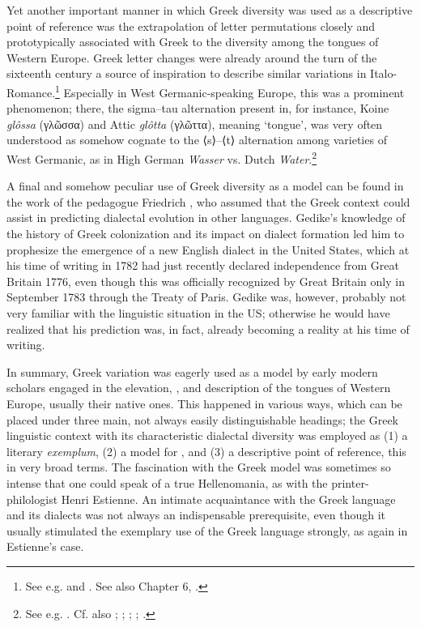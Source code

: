Yet another important manner in which Greek diversity was used as a descriptive point of reference was the extrapolation of letter permutations closely and prototypically associated with Greek to the diversity among the tongues of Western Europe. Greek letter changes were already around the turn of the sixteenth century a source of inspiration to describe similar variations in Italo-Romance.\footnote{See e.g. \citet[*.ii\textsc{\textsuperscript{v}}]{Manutius1496Aldus} and . See also Chapter 6, .} Especially in West Germanic-speaking Europe, this was a prominent phenomenon; there, the sigma–tau alternation present in, for instance, Koine \textit{glôssa} (γλῶσσα) and Attic \textit{glôtta} (γλῶττα), meaning ‘tongue’, was very often understood as somehow cognate to the ⟨s⟩–⟨t⟩ alternation among varieties of West Germanic, as in High German \textit{Wasser} vs. Dutch \textit{Water}.\footnote{See e.g. \citet[21]{Mylius1612}. Cf. also \citet[\textsc{m}.ii\textsc{\textsuperscript{r}}]{Althamer1536}; \citet[\textsc{a.3}\textsc{\textsuperscript{r}}]{Chytraeus1582}; \citet[119--132]{Reitz1730}; \citet[61--62]{Ruhig1745}; \citet[23--24]{Hof1772}.}

A final and somehow peculiar use of Greek diversity as a model can be found in the work of the  pedagogue Friedrich \citet[7]{Gedike1782}, who assumed that the Greek context could assist in predicting dialectal evolution in other languages. Gedike’s knowledge of the history of Greek colonization and its impact on dialect formation led him to prophesize the emergence of a new English dialect in the United States, which at his time of writing in 1782 had just recently declared independence from Great Britain 1776, even though this was officially recognized by Great Britain only in September 1783 through the Treaty of Paris. Gedike was, however, probably not very familiar with the linguistic situation in the US; otherwise he would have realized that his prediction was, in fact, already becoming a reality at his time of writing.

In summary, Greek variation was eagerly used as a model by early modern scholars engaged in the elevation, , and description of the  tongues of Western Europe, usually their native ones. This happened in various ways, which can be placed under three main, not always easily distinguishable headings; the Greek linguistic context with its characteristic dialectal diversity was employed as (1) a literary \textit{exemplum}, (2) a model for , and (3) a descriptive point of reference, this in very broad terms. The fascination with the Greek model was sometimes so intense that one could speak of a true Hellenomania, as with the printer-philologist Henri Estienne. An intimate acquaintance with the Greek language and its dialects was not always an indispensable prerequisite, even though it usually stimulated the exemplary use of the Greek language strongly, as again in Estienne’s case.

